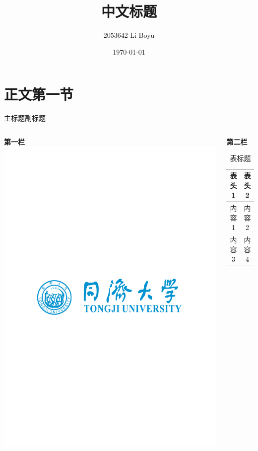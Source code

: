 \documentclass[aspectratio=169,serif]{beamer}
\author{2053642 Li Boyu}
\title{中文标题}
\date{\today}
\begin{document}
\mytitlepage

\section{正文第一节}

\begin{frame}{主标题}{副标题}
\begin{columns}
\begin{column}{0.48\textwidth}
\textbf{第一栏}
\includegraphics[width=0.98\linewidth]{./fig/tongjilogo.pdf}
\end{column}
\begin{column}{0.48\textwidth}
\textbf{第二栏}
\begin{table}[H]
\centering
\caption{表标题}
\begin{tabular}{cc}
\hline
表头1 & 表头2 \\
\hline
内容1 & 内容2 \\
内容3 & 内容4 \\
\hline
\end{tabular}
\end{table}
\end{column}
\end{columns}
\end{frame}
\end{document}
